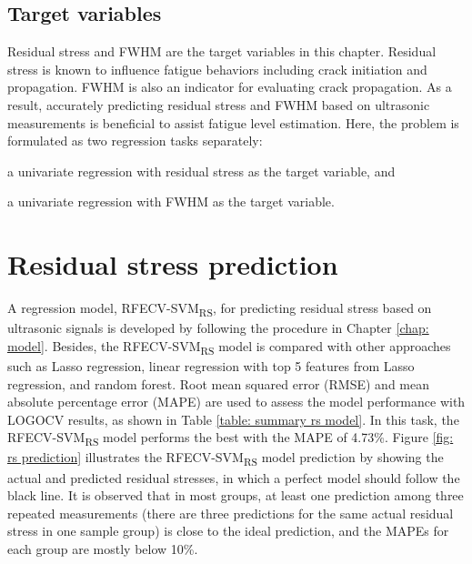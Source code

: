 \subsection{Target variables}
Residual stress and FWHM are the target variables in this chapter. Residual stress is known to influence fatigue behaviors including crack initiation and propagation. FWHM is also an indicator for evaluating crack propagation. As a result, accurately predicting residual stress and FWHM based on ultrasonic measurements is beneficial to assist fatigue level estimation. Here, the problem is formulated as two regression tasks separately:
\begin{enumerate*}[label=(\alph*)]
    \item a univariate regression with residual stress as the target variable, and
    \item a univariate regression with FWHM as the target variable.
\end{enumerate*}


\section{Residual stress prediction}
\label{sec: rs prediction}
A regression model, RFECV-SVM\textsubscript{RS}, for predicting residual stress based on ultrasonic signals is developed by following the procedure in Chapter \ref{chap: model}. Besides, the RFECV-SVM\textsubscript{RS} model is compared with other approaches such as Lasso regression, linear regression with top 5 features from Lasso regression, and random forest. Root mean squared error (RMSE) and mean absolute percentage error (MAPE) are used to assess the model performance with LOGOCV results, as shown in Table \ref{table: summary rs model}. In this task, the RFECV-SVM\textsubscript{RS} model performs the best with the MAPE of 4.73\%. Figure \ref{fig: rs prediction} illustrates the RFECV-SVM\textsubscript{RS} model prediction by showing the actual and predicted residual stresses, in which a perfect model should follow the black line. It is observed that in most groups, at least one prediction among three repeated measurements (there are three predictions for the same actual residual stress in one sample group) is close to the ideal prediction, and the MAPEs for each group are mostly below 10\%.

